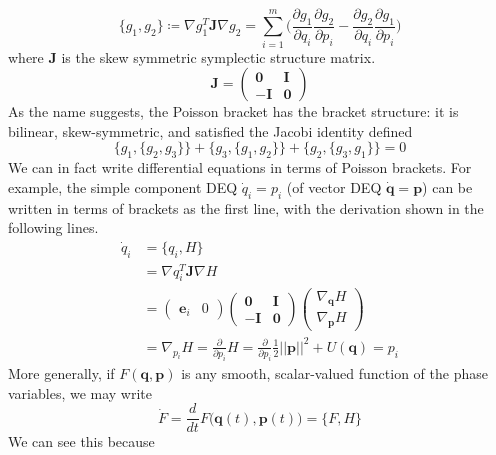 \documentclass{article}
\theoremstyle{remark}
\theoremstyle{definition}
\begin{document}
\[\{g_1, g_2\} \coloneqq \nabla g_1^T \mathbf{J} \nabla g_2 = \sum_{i=1}^m \bigg( \frac{\partial g_1}{\partial q_i} \frac{\partial g_2}{\partial p_i} - \frac{ \partial g_2}{\partial q_i} \frac{\partial g_1}{\partial p_i} \bigg)\]
where $\mathbf{J}$ is the skew symmetric symplectic structure matrix.
\[\mathbf{J} = \begin{pmatrix} \mathbf{0} & \mathbf{I} \\ -\mathbf{I} & \mathbf{0} \end{pmatrix}\]
As the name suggests, the Poisson bracket has the bracket structure: it is bilinear, skew-symmetric, and satisfied the Jacobi identity defined 
\[\{ g_1, \{g_2, g_3\} \} + \{g_3, \{ g_1, g_2\}\} + \{g_2, \{g_3, g_1\}\} = 0\]
We can in fact write differential equations in terms of Poisson brackets. For example, the simple component DEQ $\dot{q}_i = p_i$ (of vector DEQ $\mathbf{\dot{q}} = \mathbf{p}$) can be written in terms of brackets as the first line, with the derivation shown in the following lines. 
\begin{align*}
    \dot{q}_i & = \{q_i, H\} \\
    & = \nabla q_i^T \mathbf{J} \nabla H \\
    & = \begin{pmatrix}
    \mathbf{e}_i & 0 
    \end{pmatrix} \begin{pmatrix}
    \mathbf{0} & \mathbf{I} \\ -\mathbf{I} & \mathbf{0} 
    \end{pmatrix} \begin{pmatrix}
    \nabla_\mathbf{q} H \\ \nabla_\mathbf{p} H 
    \end{pmatrix} \\
    & = \nabla_{p_i} H = \frac{\partial}{\partial p_i} H = \frac{\partial}{\partial p_i} \frac{1}{2} ||\mathbf{p}||^2 + U(\mathbf{q}) = p_i
\end{align*}
More generally, if $F(\mathbf{q}, \mathbf{p})$ is any smooth, scalar-valued function of the phase variables, we may write 
\[\dot{F} = \frac{d}{dt} F \big( \mathbf{q}(t), \mathbf{p}(t)\big) = \{F, H\}\]
We can see this because 
\end{document}
